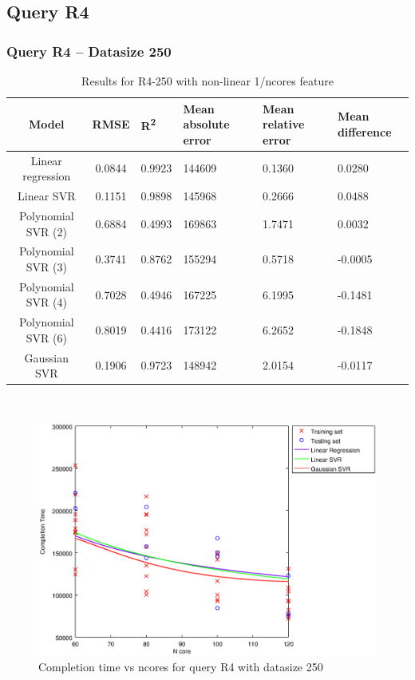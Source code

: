 \documentclass[a4paper,11pt]{article}
\begin{document}
\newpage
\subsection{Query R4}
\subsubsection{Query R4 -- Datasize 250}
\begin{table}[H]
	\centering
	\begin{adjustbox}{center}
		\begin{tabular}{c | c M{1.2cm} M{2.5cm} M{2.5cm} M{1.8cm}}
			Model & RMSE & R\textsuperscript{2} & Mean absolute error & Mean relative error & Mean difference \tabularnewline
			\hline
			Linear regression & 0.0844 & 0.9923 & 144609 & 0.1360 & 0.0280 \\
			Linear SVR & 0.1151 & 0.9898 & 145968 & 0.2666 & 0.0488 \\
			Polynomial SVR (2) & 0.6884 & 0.4993 & 169863 & 1.7471 & 0.0032 \\
			Polynomial SVR (3) & 0.3741 & 0.8762 & 155294 & 0.5718 & -0.0005 \\
			Polynomial SVR (4) & 0.7028 & 0.4946 & 167225 & 6.1995 & -0.1481 \\
			Polynomial SVR (6) & 0.8019 & 0.4416 & 173122 & 6.2652 & -0.1848 \\
			Gaussian SVR & 0.1906 & 0.9723 & 148942 & 2.0154 & -0.0117 \\
		\end{tabular}
	\end{adjustbox}
	\\
	\caption{Results for R4-250 with non-linear 1/ncores feature}
	\label{table_R4_prediction_all}
\end{table}

\begin {figure}[hbtp]
\centering
\includegraphics[width=\textwidth]{output/R4_250_NO_72_90_1_OVER_NCORES/plot_R4_250_bestmodels.eps}
\caption {Completion time vs ncores for query R4 with datasize 250}
\end {figure}
\end{document}
